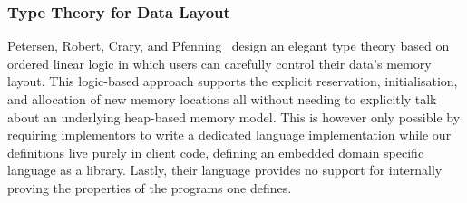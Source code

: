 \subsubsection{Type Theory for Data Layout}

Petersen, Robert, Crary, and Pfenning~\citeyearpar{DBLP:conf/popl/PetersenHCP03}
design an elegant type theory based on ordered linear logic
in which users can carefully control their data's memory
layout.
%
This logic-based approach supports the explicit reservation,
initialisation, and allocation of new memory locations all
without needing to explicitly talk about an underlying
heap-based memory model.
%
This is however only possible by requiring implementors to
write a dedicated language implementation while our definitions
live purely in client code, defining an embedded domain
specific language as a library.
%
Lastly, their language provides no support for internally
proving the properties of the programs one defines.
